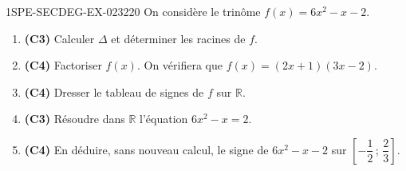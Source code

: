 \begin{exercice}{1SPE-SECDEG-EX-023}{2}{20}
On considère le trinôme $f(x) = 6x^2 - x - 2$.

\begin{enumerate}
  \item \textbf{(C3)} Calculer $\Delta$ et déterminer les racines de $f$.
  \item \textbf{(C4)} Factoriser $f(x)$. On vérifiera que $f(x) = (2x+1)(3x-2)$.
  \item \textbf{(C4)} Dresser le tableau de signes de $f$ sur $\mathbb{R}$.
  \item \textbf{(C3)} Résoudre dans $\mathbb{R}$ l'équation $6x^2 - x = 2$.
  \item \textbf{(C4)} En déduire, sans nouveau calcul, le signe de $6x^2 - x - 2$ sur $\left[-\dfrac{1}{2}\,;\,\dfrac{2}{3}\right]$.
\end{enumerate}
\end{exercice}
